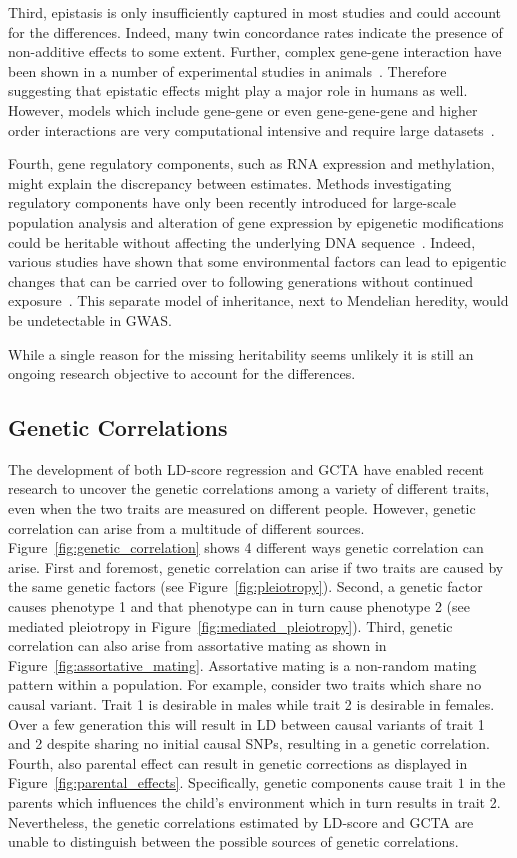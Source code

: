 Third, epistasis is only insufficiently captured in most studies and could account for the differences.
Indeed, many twin concordance rates indicate the presence of non-additive effects to some extent.
Further, complex gene-gene interaction have been shown in a number of experimental studies in  animals~\cite{Zuk24012012}.
Therefore suggesting that epistatic effects might play a major role in humans as well.
However, models which include gene-gene or even gene-gene-gene and higher order interactions are very computational intensive and require large datasets~\cite{Lippert2013}. 

Fourth, gene regulatory components, such as RNA expression and methylation, might explain the discrepancy between estimates.
Methods investigating regulatory components have only been recently introduced for large-scale population analysis and alteration of gene expression by epigenetic modifications could be heritable without affecting the underlying DNA sequence~\cite{Trerotola2015,Nadeau2009}.
Indeed, various studies have shown that some environmental factors can lead to epigentic changes that can be carried over to following generations without continued exposure~\cite{Nadeau2009,Skinner2011}.
This separate model of inheritance, next to Mendelian heredity, would be undetectable in GWAS\@.

While a single reason for the missing heritability seems unlikely it is still an ongoing research objective to account for the differences.

\subsection{Genetic Correlations}
\label{sub:genetic_correlations_method}
The development of both LD-score regression and GCTA have enabled recent research to uncover the genetic correlations among a variety of different traits, even when the two traits are measured on different people.
However, genetic correlation can arise from a multitude of different sources.
Figure~\ref{fig:genetic_correlation} shows 4 different ways genetic correlation can arise.
First and foremost, genetic correlation can arise if two traits are caused by the same genetic factors (see Figure~\ref{fig:pleiotropy}).
Second, a genetic factor  causes phenotype 1 and that phenotype can in turn cause phenotype 2 (see mediated pleiotropy in Figure~\ref{fig:mediated_pleiotropy}).
Third, genetic correlation can also arise from assortative mating as shown in Figure~\ref{fig:assortative_mating}.
Assortative mating is a non-random mating pattern within a population.
For example, consider two traits which share no causal variant.
Trait 1 is desirable in males while trait 2 is desirable in females.
Over a few generation this will result in LD between causal variants of trait 1 and 2 despite sharing no initial causal SNPs, resulting in a genetic correlation. 
Fourth, also parental effect can result in genetic corrections as displayed in Figure~\ref{fig:parental_effects}.
Specifically, genetic components cause trait $1$ in the parents which influences the child's environment which in turn results in trait 2. 
Nevertheless, the genetic correlations estimated by LD-score and GCTA are unable to distinguish between the possible sources of genetic correlations.

